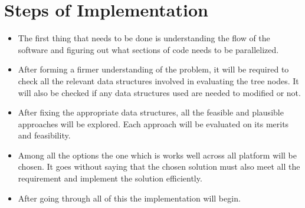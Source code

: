 \section{Steps of Implementation}
\begin{itemize}
	\item The first thing that needs to be done is understanding the flow of the software and figuring out what sections of code needs to be parallelized.
	\item After forming a firmer understanding of the problem, it will be required to check all the relevant data structures involved in evaluating the tree nodes. It will also be checked if any data structures used are needed to modified or not.
	\item After fixing the appropriate data structures, all the feasible and plausible approaches will be explored. Each approach will be evaluated on its merits and feasibility.
	\item Among all the options the one which is works well across all platform will be chosen. It goes without saying that the chosen solution must also meet all the requirement and implement the solution efficiently.
	\item After going through all of this the implementation will begin.
\end{itemize}
